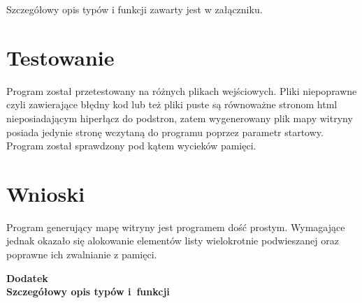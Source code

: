 \documentclass[12pt,a4paper,twoside]{article}
\begin{document}
Szczegółowy opis typów i funkcji zawarty jest w załączniku.

 

\section{Testowanie}
Program został przetestowany na różnych plikach wejściowych. Pliki niepoprawne czyli zawierające błędny kod lub też pliki puste są równoważne stronom html nieposiadającym hiperłącz do podstron, zatem wygenerowany plik mapy witryny posiada jedynie stronę wczytaną do programu poprzez parametr startowy. Program został sprawdzony pod kątem wycieków pamięci.

\section{Wnioski}
Program generujący mapę witryny jest programem dość prostym. Wymagające jednak okazało się alokowanie elementów listy wielokrotnie podwieszanej oraz poprawne ich zwalnianie z pamięci.

 
\cleardoublepage

\rule{0cm}{0cm}

\vfill

\begin{center}
\Huge\bfseries Dodatek\\Szczegółowy opis typów i~funkcji\par
\end{center}

\vfill 

\rule{0cm}{0cm}
\end{document}
